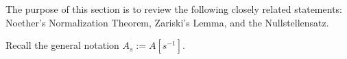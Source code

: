 \documentclass[parskip=half,fontsize=12pt]{scrartcl}%
\begin{document}
The purpose of this section is to review the following closely related statements: Noether's Normalization Theorem, Zariski's Lemma, %
and the Nullstellensatz.


Recall the general notation $A_s:=A[s^{-1}]$.%
\end{document}
